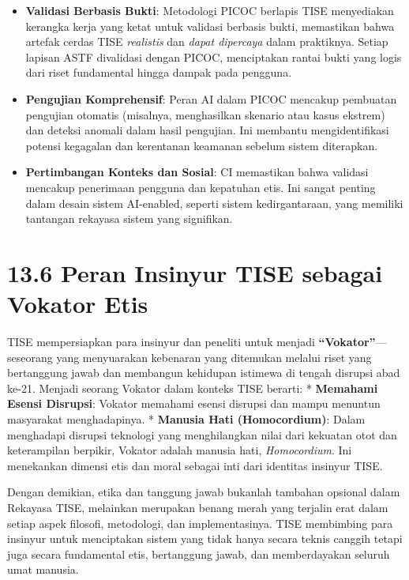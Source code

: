 \documentclass[
  letterpaper,
  DIV=11,
  numbers=noendperiod]{scrreprt}
\providecommand{\tightlist}{%
  \setlength{\itemsep}{0pt}\setlength{\parskip}{0pt}}
\begin{document}
\begin{itemize}
\tightlist
\item
  \textbf{Validasi Berbasis Bukti}: Metodologi PICOC berlapis TISE
  menyediakan kerangka kerja yang ketat untuk validasi berbasis bukti,
  memastikan bahwa artefak cerdas TISE \emph{realistis} dan \emph{dapat
  dipercaya} dalam praktiknya. Setiap lapisan ASTF divalidasi dengan
  PICOC, menciptakan rantai bukti yang logis dari riset fundamental
  hingga dampak pada pengguna.
\item
  \textbf{Pengujian Komprehensif}: Peran AI dalam PICOC mencakup
  pembuatan pengujian otomatis (misalnya, menghasilkan skenario atau
  kasus ekstrem) dan deteksi anomali dalam hasil pengujian. Ini membantu
  mengidentifikasi potensi kegagalan dan kerentanan keamanan sebelum
  sistem diterapkan.
\item
  \textbf{Pertimbangan Konteks dan Sosial}: CI memastikan bahwa validasi
  mencakup penerimaan pengguna dan kepatuhan etis. Ini sangat penting
  dalam desain sistem AI-enabled, seperti sistem kedirgantaraan, yang
  memiliki tantangan rekayasa sistem yang signifikan.
\end{itemize}

\section{\texorpdfstring{\textbf{13.6 Peran Insinyur TISE sebagai
Vokator
Etis}}{13.6 Peran Insinyur TISE sebagai Vokator Etis}}\label{peran-insinyur-tise-sebagai-vokator-etis}

TISE mempersiapkan para insinyur dan peneliti untuk menjadi
\textbf{``Vokator''}---seseorang yang menyuarakan kebenaran yang
ditemukan melalui riset yang bertanggung jawab dan membangun kehidupan
istimewa di tengah disrupsi abad ke-21. Menjadi seorang Vokator dalam
konteks TISE berarti: * \textbf{Memahami Esensi Disrupsi}: Vokator
memahami esensi disrupsi dan mampu menuntun masyarakat menghadapinya. *
\textbf{Manusia Hati (Homocordium)}: Dalam menghadapi disrupsi teknologi
yang menghilangkan nilai dari kekuatan otot dan keterampilan berpikir,
Vokator adalah manusia hati, \emph{Homocordium}. Ini menekankan dimensi
etis dan moral sebagai inti dari identitas insinyur TISE.

Dengan demikian, etika dan tanggung jawab bukanlah tambahan opsional
dalam Rekayasa TISE, melainkan merupakan benang merah yang terjalin erat
dalam setiap aspek filosofi, metodologi, dan implementasinya. TISE
membimbing para insinyur untuk menciptakan sistem yang tidak hanya
secara teknis canggih tetapi juga secara fundamental etis, bertanggung
jawab, dan memberdayakan seluruh umat manusia.
\end{document}
